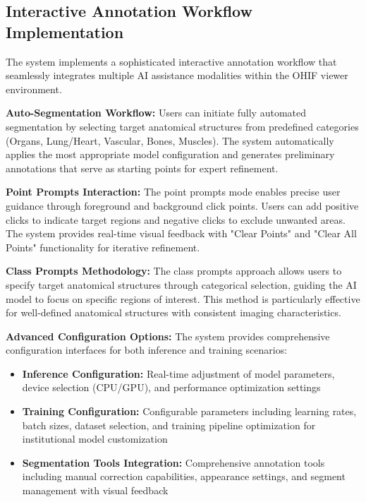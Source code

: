 \subsection{Interactive Annotation Workflow Implementation}

The system implements a sophisticated interactive annotation workflow that seamlessly integrates multiple AI assistance modalities within the OHIF viewer environment.

\textbf{Auto-Segmentation Workflow:} Users can initiate fully automated segmentation by selecting target anatomical structures from predefined categories (Organs, Lung/Heart, Vascular, Bones, Muscles). The system automatically applies the most appropriate model configuration and generates preliminary annotations that serve as starting points for expert refinement.

\textbf{Point Prompts Interaction:} The point prompts mode enables precise user guidance through foreground and background click points. Users can add positive clicks to indicate target regions and negative clicks to exclude unwanted areas. The system provides real-time visual feedback with "Clear Points" and "Clear All Points" functionality for iterative refinement.

\textbf{Class Prompts Methodology:} The class prompts approach allows users to specify target anatomical structures through categorical selection, guiding the AI model to focus on specific regions of interest. This method is particularly effective for well-defined anatomical structures with consistent imaging characteristics.

\textbf{Advanced Configuration Options:} The system provides comprehensive configuration interfaces for both inference and training scenarios:

\begin{itemize}
    \item \textbf{Inference Configuration:} Real-time adjustment of model parameters, device selection (CPU/GPU), and performance optimization settings
    \item \textbf{Training Configuration:} Configurable parameters including learning rates, batch sizes, dataset selection, and training pipeline optimization for institutional model customization
    \item \textbf{Segmentation Tools Integration:} Comprehensive annotation tools including manual correction capabilities, appearance settings, and segment management with visual feedback
\end{itemize}

